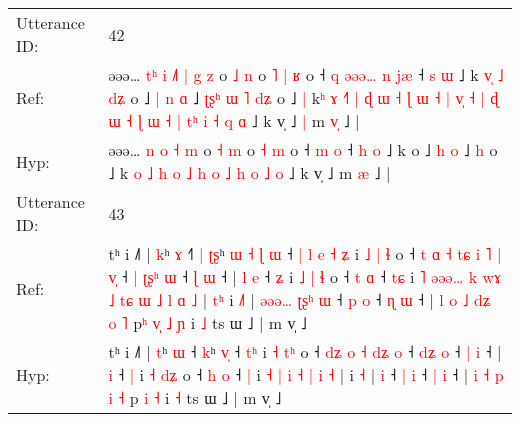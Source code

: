 \documentclass[10pt]{article}
\DeclareRobustCommand{\hl}[1]{{\textcolor{red}{#1}}}
\begin{document}
\begin{longtable}{ll}
 \\
\midrule
Utterance ID: & 42 \\
Ref: & əəə…\hl{ }\hl{t}\hl{ʰ}\hl{ }\hl{i} \hl{˩}\hl{˥} \hl{|} \hl{g} \hl{z} o \hl{˩} \hl{n} o\hl{ }\hl{˥} \hl{|} \hl{ʁ} o ˧\hl{ }\hl{q}\hl{ }\hl{ə}\hl{ə}\hl{ə}\hl{…} \hl{n} \hl{j}\hl{æ} ˧ \hl{s} \hl{ɯ} ˩ k\hl{ }\hl{v}\hl{̩}\hl{ }\hl{˩}\hl{ }\hl{d}\hl{ʑ} o ˩\hl{ }\hl{|} \hl{n} \hl{ɑ} ˩\hl{ }\hl{ʈ}\hl{ʂ}\hl{ʰ}\hl{ }\hl{ɯ}\hl{ }\hl{˥} \hl{d}\hl{ʑ} o ˩\hl{ }\hl{|} k\hl{ʰ}\hl{ }\hl{ɤ}\hl{ }\hl{˧}\hl{˥}\hl{ }\hl{|}\hl{ }\hl{ɖ}\hl{ }\hl{ɯ}\hl{ }\hl{˧}\hl{ }\hl{ɭ}\hl{ }\hl{ɯ}\hl{ }\hl{˧}\hl{ }\hl{|}\hl{ }\hl{v}\hl{̩}\hl{ }\hl{˧}\hl{ }\hl{|} \hl{ɖ} \hl{ɯ} \hl{˧} \hl{ɭ} \hl{ɯ} \hl{˧} \hl{|} \hl{t}\hl{ʰ} \hl{i} \hl{˧} \hl{q} \hl{ɑ} ˩ k v̩ ˩\hl{ }\hl{|} m \hl{v}\hl{̩} ˩ |
 \\
Hyp: & əəə…\hl{}\hl{}\hl{}\hl{}\hl{} \hl{}\hl{n} \hl{o} \hl{˧} \hl{m} o \hl{˧} \hl{m} o\hl{}\hl{} \hl{˧} \hl{m} o ˧\hl{}\hl{}\hl{}\hl{}\hl{}\hl{}\hl{} \hl{m} \hl{}\hl{o} ˧ \hl{h} \hl{o} ˩ k\hl{}\hl{}\hl{}\hl{}\hl{}\hl{}\hl{}\hl{} o ˩\hl{}\hl{} \hl{h} \hl{o} ˩\hl{}\hl{}\hl{}\hl{}\hl{}\hl{}\hl{}\hl{} \hl{}\hl{h} o ˩\hl{}\hl{} k\hl{}\hl{}\hl{}\hl{}\hl{}\hl{}\hl{}\hl{}\hl{}\hl{}\hl{}\hl{}\hl{}\hl{}\hl{}\hl{}\hl{}\hl{}\hl{}\hl{}\hl{}\hl{}\hl{}\hl{}\hl{}\hl{}\hl{}\hl{}\hl{} \hl{o} \hl{˩} \hl{h} \hl{o} \hl{˩} \hl{h} \hl{o} \hl{}\hl{˩} \hl{h} \hl{o} \hl{˩} \hl{o} ˩ k v̩ ˩\hl{}\hl{} m \hl{}\hl{æ} ˩ |
 \\
\midrule
Utterance ID: & 43 \\
Ref: & tʰ i ˩˥ | \hl{k}ʰ \hl{ɤ} ˧\hl{˥}\hl{ }\hl{|} \hl{ʈ}\hl{ʂ}ʰ\hl{ }\hl{ɯ}\hl{ }\hl{˧} \hl{ɭ}\hl{ }\hl{ɯ} ˧\hl{ }\hl{|}\hl{ }\hl{l}\hl{ }\hl{e} \hl{˧}\hl{ }\hl{ʑ} i \hl{˩} \hl{|}\hl{ }\hl{ɬ} o ˧\hl{ }\hl{t} \hl{ɑ}\hl{ }\hl{˧} \hl{t}\hl{ɕ} \hl{i} \hl{˥}\hl{ }\hl{|} \hl{v}\hl{̩} ˧\hl{ }\hl{|} \hl{ʈ}\hl{ʂ}\hl{ʰ} \hl{ɯ} ˧ \hl{ɭ} \hl{ɯ} ˧ |\hl{ }\hl{l} \hl{e} ˧ \hl{ʑ} i \hl{˩} \hl{|}\hl{ }\hl{ɬ} o ˧ \hl{t} \hl{ɑ} ˧ \hl{t}\hl{ɕ} i\hl{ }\hl{˥}\hl{ }\hl{ə}\hl{ə}\hl{ə}\hl{…}\hl{ }\hl{k}\hl{ }\hl{w}\hl{ɤ} \hl{˩} \hl{t}\hl{ɕ} \hl{ɯ} \hl{˩} \hl{l} \hl{ɑ} \hl{˩} |\hl{ }\hl{t}\hl{ʰ} i \hl{˩}\hl{˥} |\hl{ }\hl{ə}\hl{ə}\hl{ə}\hl{…}\hl{ }\hl{ʈ}\hl{ʂ}\hl{ʰ} \hl{ɯ} ˧ \hl{p} \hl{o} ˧ \hl{ɳ} \hl{ɯ} ˧ |\hl{ }\hl{l} \hl{o} \hl{˩} \hl{d}\hl{ʑ} \hl{o} \hl{˥} p\hl{ʰ}\hl{ }\hl{v}\hl{̩} \hl{˩} \hl{ɲ} i \hl{˩} ts ɯ ˩ | m v̩ ˩
 \\
Hyp: & tʰ i ˩˥ | \hl{t}ʰ \hl{ɯ} ˧\hl{}\hl{}\hl{} \hl{}\hl{k}ʰ\hl{}\hl{}\hl{}\hl{} \hl{}\hl{v}\hl{̩} ˧\hl{}\hl{}\hl{}\hl{}\hl{}\hl{} \hl{}\hl{t}\hl{ʰ} i \hl{˧} \hl{}\hl{t}\hl{ʰ} o ˧\hl{}\hl{} \hl{}\hl{d}\hl{ʑ} \hl{}\hl{o} \hl{˧} \hl{}\hl{d}\hl{ʑ} \hl{}\hl{o} ˧\hl{}\hl{} \hl{}\hl{d}\hl{ʑ} \hl{o} ˧ \hl{|} \hl{i} ˧ |\hl{}\hl{} \hl{i} ˧ \hl{|} i \hl{˧} \hl{}\hl{d}\hl{ʑ} o ˧ \hl{h} \hl{o} ˧ \hl{}\hl{|} i\hl{}\hl{}\hl{}\hl{}\hl{}\hl{}\hl{}\hl{}\hl{}\hl{}\hl{}\hl{} \hl{˧} \hl{}\hl{|} \hl{i} \hl{˧} \hl{|} \hl{i} \hl{˧} |\hl{}\hl{}\hl{} i \hl{}\hl{˧} |\hl{}\hl{}\hl{}\hl{}\hl{}\hl{}\hl{}\hl{}\hl{} \hl{i} ˧ \hl{|} \hl{i} ˧ \hl{|} \hl{i} ˧ |\hl{}\hl{} \hl{i} \hl{˧} \hl{}\hl{p} \hl{i} \hl{˧} p\hl{}\hl{}\hl{}\hl{} \hl{i} \hl{˧} i \hl{˧} ts ɯ ˩ | m v̩ ˩

\end{longtable}
\end{document}
